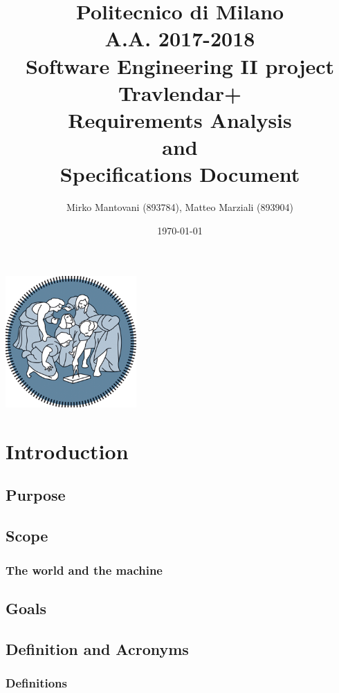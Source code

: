 \documentclass{article}
\author{Mirko Mantovani (893784), Matteo Marziali (893904)}
\date{\today}
\title{Politecnico di Milano
	\\A.A. 2017\@-\@2018
	\\Software Engineering II project \\ \textbf{Travlendar+}
	\\\textbf{R}equirements \textbf{A}nalysis \\and\\ \textbf{S}pecifications \textbf{D}ocument}
\begin{document}
\maketitle
\begin{center}
	\includegraphics[width=5cm]{polimi-logo}
\end{center}
\clearpage
{\hypersetup{hidelinks}\tableofcontents}

\clearpage

\section{Introduction}

\subsection{Purpose}



\newpage
\subsection{Scope}

\subsubsection{The world and the machine}

\clearpage
\subsection{Goals}


\subsection{Definition and Acronyms}

\subsubsection{Definitions}

\end{document}
